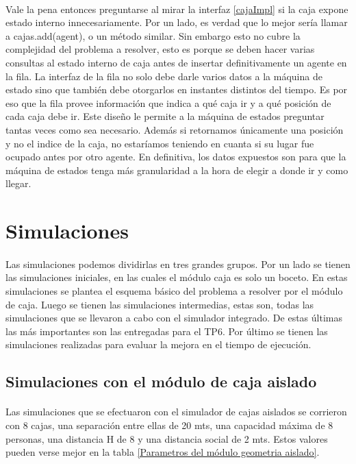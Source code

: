 \documentclass{article}
\begin{document}
\paragraph{}
Vale la pena entonces preguntarse al mirar la interfaz \ref{cajaImpl} si la caja expone estado interno innecesariamente. Por un lado, es verdad que lo mejor sería llamar a cajas.add(agent), o un método similar. Sin embargo esto no cubre la complejidad del problema a resolver, esto es porque se deben hacer varias consultas al estado interno de caja antes de insertar definitivamente un agente en la fila. La interfaz de la fila no solo debe darle varios datos a la máquina de estado sino que también debe otorgarlos en instantes distintos del tiempo. Es por eso que la fila provee información que indica a qué caja ir y a qué posición de cada caja debe ir. Este diseño le permite a la máquina de estados preguntar tantas veces como sea necesario. Además si retornamos únicamente una posición y no el indice de la caja, no estaríamos teniendo en cuanta si su lugar fue ocupado antes por otro agente. En definitiva, los datos expuestos son para que la máquina de estados tenga más granularidad a la hora de elegir a donde ir y como llegar.

\section{Simulaciones}

\paragraph{}
Las simulaciones podemos dividirlas en tres grandes grupos. Por un lado se tienen las simulaciones iniciales, en las cuales el módulo caja es solo un boceto. En estas simulaciones se plantea el esquema básico del problema a resolver por el módulo de caja. Luego se tienen las simulaciones intermedias, estas son, todas las simulaciones que se llevaron a cabo con el simulador integrado. De estas últimas las más importantes son las entregadas para el TP6. Por último se tienen las simulaciones realizadas para evaluar la mejora en el tiempo de ejecución.

\subsection{Simulaciones con el módulo de caja aislado}

\paragraph{}
Las simulaciones que se efectuaron con el simulador de cajas aislados se corrieron con 8 cajas, una separación entre ellas de 20 mts, una capacidad máxima de 8 personas, una distancia H de 8 y una distancia social de 2 mts. Estos valores pueden verse mejor en la tabla \ref{Parametros del módulo geometria aislado}.
\end{document}
